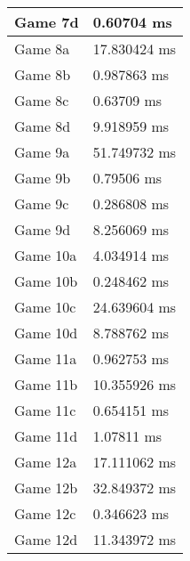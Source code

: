 \begin{tabular}{|l|l|}
	Game 7d & 0.60704 ms \\ \hline
	Game 8a & 17.830424 ms \\ \hline
	Game 8b & 0.987863 ms \\ \hline
	Game 8c & 0.63709 ms \\ \hline
	Game 8d & 9.918959 ms \\ \hline
	Game 9a & 51.749732 ms \\ \hline
	Game 9b & 0.79506 ms \\ \hline
	Game 9c & 0.286808 ms \\ \hline
	Game 9d & 8.256069 ms \\ \hline
	Game 10a & 4.034914 ms \\ \hline
	Game 10b & 0.248462 ms \\ \hline
	Game 10c & 24.639604 ms \\ \hline
	Game 10d & 8.788762 ms \\ \hline
	Game 11a & 0.962753 ms \\ \hline
	Game 11b & 10.355926 ms \\ \hline
	Game 11c & 0.654151 ms \\ \hline
	Game 11d & 1.07811 ms \\ \hline
	Game 12a & 17.111062 ms \\ \hline
	Game 12b & 32.849372 ms \\ \hline
	Game 12c & 0.346623 ms \\ \hline
	Game 12d & 11.343972 ms \\ \hline
\end{tabular}
